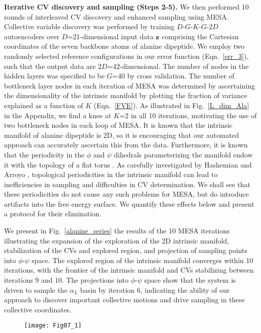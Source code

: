 \documentclass[12pt]{article}
\newcommand*{\blauw}[1]{#1}
\begin{document}
\textbf{Iterative CV discovery and sampling (Steps 2-5).} We then performed 10 rounds of interleaved CV discovery and enhanced sampling using MESA. Collective variable discovery was performed by training $D$-$G$-$K$-$G$-$2D$ autoencoders over $D$=21-dimensional input data $\textbf{z}$ comprising the Cartesian coordinates of the seven backbone atoms of alanine dipeptide. We employ two randomly selected reference configurations in our error function (\blauw{Eqn.~\ref{err_3}}), such that the output data are $2D$=42-dimensional. The number of nodes in the hidden layers was specified to be $G$=40 by cross validation. The number of bottleneck layer nodes in each iteration of MESA was determined by ascertaining the dimensionality of the intrinsic manifold by plotting the fraction of variance explained as a function of $K$ (\blauw{Eqn.~\ref{FVE}}). As illustrated in \blauw{Fig.~\ref{L_dim_Ala}} in the \blauw{Appendix}, we find a knee at $K$=2 in all 10 iterations, motivating the use of two bottleneck nodes in each loop of MESA. It is known that the intrinsic manifold of alanine dipeptide is 2D, so it is encouraging that our automated approach can accurately ascertain this from the data. Furthermore, it is known that the periodicity in the $\phi$ and $\psi$ dihedrals parameterizing the manifold endow it with the topology of a flat torus \cite{hashemian2015topological}. As carefully investigated by Hashemian and Arroyo \cite{hashemian2015topological}, topological periodicities in the intrinsic manifold can lead to inefficiencies in sampling and difficulties in CV determination. We shall see that these periodicities do not cause any such problems for MESA, but do introduce artifacts into the free energy surface. We quantify these effects below and present a protocol for their elimination.

We present in \blauw{Fig.~\ref{alanine_series}} the results of the 10 MESA iterations illustrating the expansion of the exploration of the 2D intrinsic manifold, stabilization of the CVs and explored region, and projection of sampling points into $\phi$-$\psi$ space. The explored region of the intrinsic manifold converges within 10 iterations, with the frontier of the intrinsic manifold and CVs stabilizing between iterations 9 and 10. The projections into $\phi$-$\psi$ space show that the system is driven to sample the $\alpha_L$ basin by iteration 6, indicating the ability of our approach to discover important collective motions and drive sampling in these collective coordinates.

\begin{figure}[ht!]
\begin{center}
\texttt{[image: Fig07\_1]} 
\end{center}
\end{figure}
\end{document}
